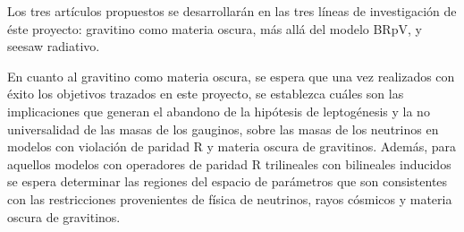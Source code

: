 Los tres artículos propuestos se desarrollarán en las tres líneas de
investigación de éste proyecto: gravitino como materia oscura, más allá
del modelo BRpV, y seesaw radiativo. 

\begin{gravitinodm}
  En cuanto al gravitino como materia oscura, se espera que una vez
  realizados con éxito los objetivos trazados en este proyecto, se
  establezca cuáles son las implicaciones que generan el abandono de
  la hipótesis de leptogénesis y la no universalidad de las masas de
  los gauginos, sobre las masas de los neutrinos en modelos con
  violación de paridad R y materia oscura de gravitinos. Además, para
  aquellos modelos con operadores de paridad R trilineales con
  bilineales inducidos se espera determinar las regiones del espacio
  de parámetros que son consistentes con las restricciones
  provenientes de física de neutrinos, rayos cósmicos y materia oscura
  de gravitinos.
\end{gravitinodm}

